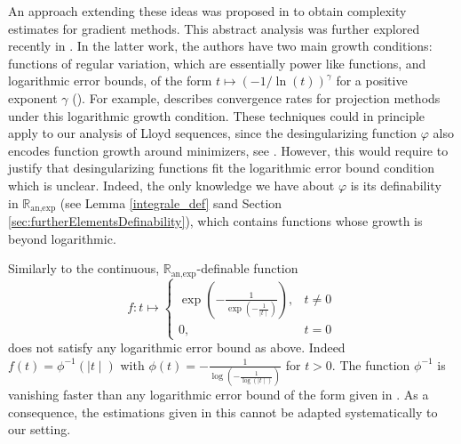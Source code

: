 \documentclass[11pt]{article}
\newcommand{\1}{\mathbbm{1}}
\numberwithin{equation}{section}
\begin{document}
An approach extending these ideas was proposed in \cite{bolte2017error} to obtain complexity estimates for gradient methods. This abstract analysis was further explored recently in \cite{liu2024convergence}. In the latter work, the authors have two main growth conditions: functions of regular variation, which are essentially power like functions, and logarithmic error bounds, of the form $t \mapsto (- 1/\ln(t))^\gamma$ for a positive exponent $\gamma$ (\cite[Definition 5.8]{liu2024convergence}). For example, \cite[Section 5.1]{liu2024convergence} describes convergence rates for projection methods under this logarithmic growth condition. These techniques could in principle apply to our analysis of Lloyd sequences, since the desingularizing function $\varphi$ also encodes function growth around minimizers, see \cite{bolte2017error}. However, this would require to justify that desingularizing functions fit the logarithmic error bound condition which is unclear.  Indeed, the only knowledge we have about $\varphi$ is its definability in $\mathbb{R}_{\text{an,exp}}$ (see Lemma \ref{integrale_def} sand Section \ref{sec:furtherElementsDefinability}), which contains functions whose growth is beyond logarithmic. 

Similarly to \cite[Example 5.9]{liu2024convergence} the continuous, $\mathbb{R}_{\text{an,exp}}$-definable function
\begin{equation*}f \colon t \mapsto
\begin{cases}
        \exp\left(-\frac{1}{\exp\left( -\frac{1}{\mid t \mid} \right)}\right),& t \neq 0\\
        0,& t=0
    \end{cases}
\end{equation*}
does not satisfy any logarithmic error bound as above. Indeed $f( t ) = \phi^{-1}(\mid t \mid)$ with $\phi(t)=-\frac{1}{\log\left(-\frac{1}{\log(\mid t\mid)} \right)}$ for $t>0$. The function $\phi^{-1}$ is vanishing faster than any logarithmic error bound of the form given in \cite[Definition 5.8]{liu2024convergence}. As a consequence, the estimations given in this \cite[Theorem 5.12]{liu2024convergence} cannot be adapted systematically to our setting.   
\end{document}
